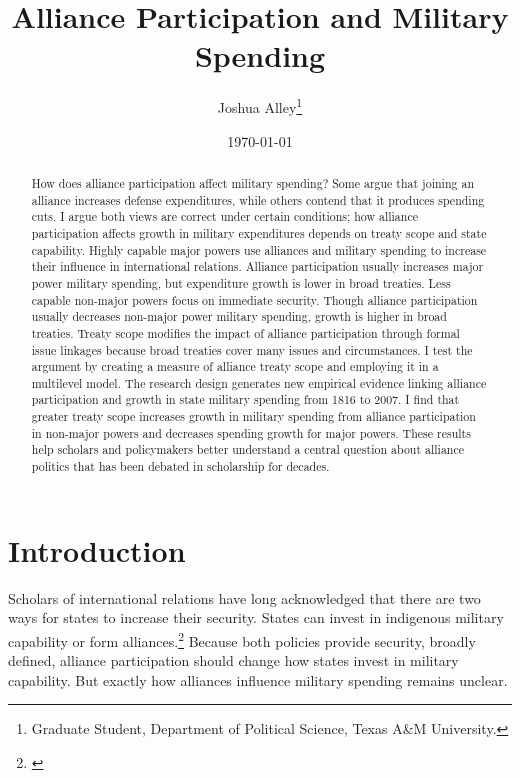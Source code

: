 \documentclass[12pt]{article}
\title{\textbf{Alliance Participation and Military Spending}}
\author{Joshua Alley\footnote{Graduate Student,
Department of Political Science, Texas A\&M University.}}
\date{{\normalsize \today}}
\begin{document}
\maketitle 

\doublespace 

\begin{abstract}
How does alliance participation affect military spending? 
Some argue that joining an alliance increases defense expenditures, while others contend that it produces spending cuts.
I argue both views are correct under certain conditions; how alliance participation affects growth in military expenditures depends on treaty scope and state capability. 
Highly capable major powers use alliances and military spending to increase their influence in international relations. 
Alliance participation usually increases major power military spending, but expenditure growth is lower in broad treaties.
Less capable non-major powers focus on immediate security. 
Though alliance participation usually decreases non-major power military spending, growth is higher in broad treaties. 
Treaty scope modifies the impact of alliance participation through formal issue linkages because broad treaties cover many issues and circumstances. 
I test the argument by creating a measure of alliance treaty scope and employing it in a multilevel model. 
The research design generates new empirical evidence linking alliance participation and growth in state military spending from 1816 to 2007. 
I find that greater treaty scope increases growth in military spending from alliance participation in non-major powers and decreases spending growth for major powers.  
These results help scholars and policymakers better understand a central question about alliance politics that has been debated in scholarship for decades. 
\end{abstract}


 \newpage 


\section{Introduction}


Scholars of international relations have long acknowledged that there are two ways for states to increase their security. 
States can invest in indigenous military capability or form alliances.\footnote{\cite{Morgenthau1948, Altfield1984, Morrow1993}}
Because both policies provide security, broadly defined, alliance participation should change how states invest in military capability. 
But exactly how alliances influence military spending remains unclear. 
\end{document}
